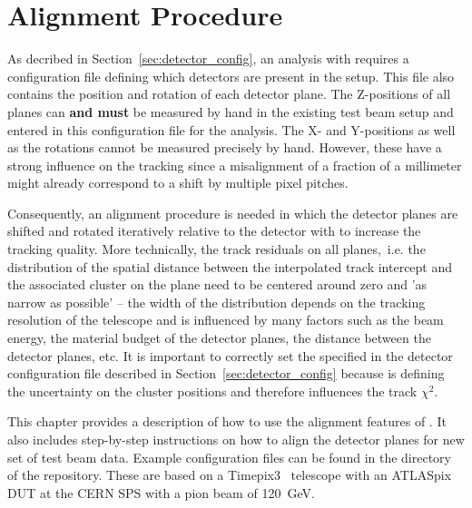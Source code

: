 \chapter{Alignment Procedure}
\label{ch:howtoalign}

As decribed in Section~\ref{sec:detector_config}, an analysis with \corry requires a configuration file defining which detectors are present in the setup.
This file also contains the position and rotation of each detector plane.
The Z-positions of all planes can \textbf{and must} be measured by hand in the existing test beam setup and entered in this configuration file for the analysis.
The X- and Y-positions as well as the rotations cannot be measured precisely by hand.
However, these have a strong influence on the tracking since a misalignment of a fraction of a millimeter might already correspond to a shift by multiple pixel pitches.

Consequently, an alignment procedure is needed in which the detector planes are shifted and rotated iteratively relative to the detector with  to increase the tracking quality.
More technically, the track residuals on all planes,~i.e. the distribution of the spatial distance between the interpolated track intercept and the associated cluster on the plane need to be centered around zero and 'as narrow as possible' -- the width of the distribution depends on the tracking resolution of the telescope and is influenced by many factors such as the beam energy, the material budget of the detector planes, the distance between the detector planes, etc.
It is important to correctly set the  specified in the detector configuration file described in Section~\ref{sec:detector_config} because is defining the uncertainty on the cluster positions and therefore influences the track $\chi^2$.

This chapter provides a description of how to use the alignment features of \corry.
It also includes step-by-step instructions on how to align the detector planes for new set of test beam data.
Example configuration files can be found in the  directory of the repository.
These are based on a Timepix3~\cite{timepix3} telescope with an ATLASpix~\cite{atlaspix} DUT at the CERN SPS with a pion beam of \SI{120}{GeV}.

